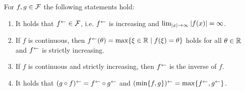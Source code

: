 \begin{proposition}
    For $f,g\in \mathcal{F}$ the following statements hold:
    \begin{enumerate}[label=(\roman*)]
        \item\label{prop:reversal-props:inner-operator} It holds that $f^{\leftarrow}\in\mathcal{F}$, i.e. $f^{\leftarrow}$ is increasing and $\lim_{\left| x \right|\rightarrow\infty} \left| f(x) \right| = \infty$.
        \item\label{prop:reversal-props:continuous} If $f$ is continuous, then $f^{\leftarrow}(\theta) = \max \{ \xi\in\mathbb{R} \mid f(\xi) = \theta \}$ holds for all $\theta\in\mathbb{R}$ and $f^{\leftarrow}$ is strictly increasing.
        \item\label{prop:reversal-props:inverse} If $f$ is continuous and strictly increasing, then  $f^{\leftarrow}$ is the inverse of $f$.
        \item\label{prop:reversal-props:composition-minimum} It holds that $(g\circ f)^{\leftarrow} = f^{\leftarrow}\circ g^{\leftarrow}$ and $(\min\{f,g\})^{\leftarrow} = \max\{f^{\leftarrow}, g^{\leftarrow}\}$.
    \end{enumerate}
\end{proposition}

